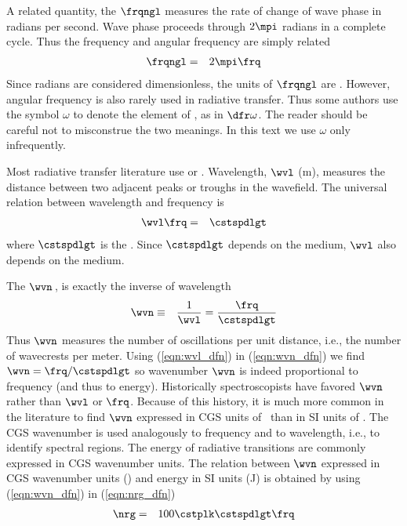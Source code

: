 \documentclass[12pt]{article}
\begin{document}
A related quantity, the  $\frqngl$ 
measures the rate of change of wave phase in radians per second.
Wave phase proceeds through $2\mpi$ radians in a complete cycle.
Thus the frequency and angular frequency are simply related
\begin{eqnarray}
\frqngl & = & 2\mpi \frq
\label{eqn:frq_ngl_dfn}
\end{eqnarray}
Since radians are considered dimensionless, the units of $\frqngl$ are
\xs. 
However, angular frequency is also rarely used in radiative transfer. 
Thus some authors use the symbol $\omega$ to denote the element 
of , as in $\dfr\omega$.
The reader should be careful not to misconstrue the two meanings.
In this text we use $\omega$ only infrequently.

Most radiative transfer literature use  or
.
Wavelength, $\wvl$ (m), measures the distance between two adjacent
peaks or troughs in the wavefield.
The universal relation between wavelength and frequency is
\begin{eqnarray}
\wvl \frq & = & \cstspdlgt
\label{eqn:wvl_dfn}
\end{eqnarray}
where $\cstspdlgt$ is the .
Since $\cstspdlgt$ depends on the medium, $\wvl$ also depends on the
medium. 

The  $\wvn$\,\xm, is exactly the inverse of
wavelength 
\begin{eqnarray}
\wvn & \equiv & \frac{1}{\wvl} = \frac{\frq}{\cstspdlgt}
\label{eqn:wvn_dfn}
\end{eqnarray}
Thus $\wvn$ measures the number of oscillations per unit distance,
i.e., the number of wavecrests per meter.
Using (\ref{eqn:wvl_dfn}) in (\ref{eqn:wvn_dfn}) we find 
$\wvn = \frq/\cstspdlgt$ so wavenumber $\wvn$ is indeed proportional
to frequency (and thus to energy). 
Historically spectroscopists have favored $\wvn$ rather than $\wvl$
or $\frq$.
Because of this history, it is much more common in the literature
to find $\wvn$ expressed in CGS units of \xcm\ than in SI units of
\xm. 
The CGS wavenumber is used analogously to frequency and to wavelength,
i.e., to identify spectral regions.
The energy of radiative transitions are commonly expressed in CGS
wavenumber units. 
The relation between $\wvn$ expressed in CGS wavenumber units (\xcm)
and energy in SI units (J) is obtained by using (\ref{eqn:wvn_dfn}) in 
(\ref{eqn:nrg_dfn})
\begin{eqnarray}
\nrg & = & 100 \cstplk \cstspdlgt \frq
\label{eqn:nrg_wvn_dfn}
\end{eqnarray}
\end{document}
